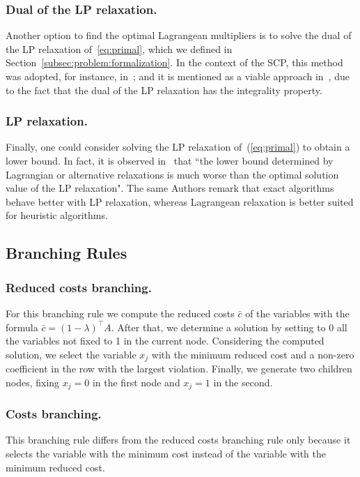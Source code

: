 \documentclass[runningheads]{llncs}
\begin{document}
\subsubsection{Dual of the LP relaxation.} Another option to find the optimal Lagrangean multipliers is to solve the dual of the LP relaxation of~\ref{eq:primal}, which we defined in Section~\ref{subsec:problem:formalization}. In the context of the SCP, this method was adopted, for instance, in~\cite{beasley-1987-algorithm,balas-ho-2009-set-covering}; and it is mentioned as a viable approach in~\cite{caprara-2000-algorithms}, due to the fact that the dual of the LP relaxation has the integrality property.

\subsubsection{LP relaxation.} Finally, one could consider solving the LP relaxation of~(\ref{eq:primal}) to obtain a lower bound. In fact, it is observed in~\cite{caprara-2000-algorithms} that ``the lower bound determined by Lagrangian or alternative relaxations is much worse than the optimal solution value of the LP relaxation". The same Authors remark that exact algorithms behave better with LP relaxation, whereas Lagrangean relaxation is better suited for heuristic algorithms.   

\subsection{Branching Rules}
\label{subsec:branch-bound:branch}

\subsubsection{Reduced costs branching.} For this branching rule we compute the reduced costs $\bar{c}$ of the variables with the formula $\bar{c} = (1 - \lambda)^\top A$. After that, we determine a solution by setting to 0 all the variables not fixed to 1 in the current node. Considering the computed solution, we select the variable $x_j$ with the minimum reduced cost and a non-zero coefficient in the row with the largest violation. Finally, we generate two children nodes, fixing $x_j = 0$ in the first node and $x_j = 1$ in the second.

\subsubsection{Costs branching.} This branching rule differs from the reduced costs branching rule only because it selects the variable with the minimum cost instead of the variable with the minimum reduced cost.
\end{document}
